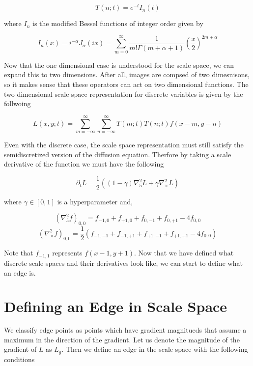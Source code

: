 \documentclass{article}
\begin{document}
    \begin{equation}
        T(n;t) = e^{-t}I_n(t)
    \end{equation} 

    where $I_n$ is the modified Bessel functions of integer order given by 

    \begin{equation}
        I_n(x) = i^{-\alpha}J_{\alpha}(ix) = \sum_{m=0}^{\infty}\frac{1}{m!\Gamma(m+\alpha+1)}\left(\frac{x}{2}\right)^{2m+\alpha}
    \end{equation}

    Now that the one dimensional case is understood for the scale space, we can expand this to two dimensions. After all, images are compsed of two dimesnisons, so it makes sense that these operators can act on two dimensional functions. The two dimensional scale space representation for discrete variables is given by the follwoing

    \begin{equation}
        L(x,y;t) = \sum_{m=-\infty}^{\infty}\sum_{n=-\infty}^{\infty}T(m;t)T(n;t)f(x-m,y-n)
    \end{equation}

    Even with the discrete case, the scale space representation must still satisfy the semidiscretized version of the diffusion equation. Therfore by taking a scale derivative of the function we must have the following

    \begin{equation}
        \partial_t L = \frac{1}{2}((1-\gamma)\nabla^2_5L+\gamma\nabla^2_\times L)
    \end{equation}

    where $\gamma \in [0,1]$ is a hyperparameter and,

    \begin{equation}
        (\nabla^2_5f)_{0,0} = f_{-1,0} + f_{+1,0} + f_{0,-1} + f_{0,+1} - 4f_{0,0}
    \end{equation}
    \begin{equation}
        (\nabla^2_\times f)_{0,0} = \frac{1}{2}(f_{-1,-1} + f_{-1,+1} + f_{+1,-1} + f_{+1,+1} - 4f_{0,0})
    \end{equation}

    Note that $f_{-1,1}$ represents $f(x-1, y+1)$. Now that we have defined what discrete scale spaces and their derivatives look like, we can start to define what an edge is.

\section{Defining an Edge in Scale Space}
    We classify edge points as points which have gradient magnitueds that assume a maximum in the direction of the gradient. Let us denote the magnitude of the gradient of $L$ as $L_g$. Then we define an edge in the scale space with the following conditions
\end{document}
